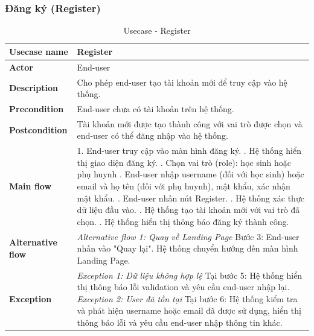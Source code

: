 \newpage
\subsubsection{Đăng ký (Register)}
\begin{table}[H]
  \centering
  \renewcommand{\arraystretch}{1.3}
  \begin{tabular}{|l|p{}|}
    \hline
    \textbf{Usecase name} & Register \\ \hline
    \textbf{Actor} & End-user \\ \hline
    \textbf{Description} & Cho phép end-user tạo tài khoản mới để truy cập vào hệ thống. \\ \hline
    \textbf{Precondition} & End-user chưa có tài khoản trên hệ thống. \\ \hline
    \textbf{Postcondition} & Tài khoản mới được tạo thành công với vai trò được chọn và end-user có thể đăng nhập vào hệ thống. \\ \hline
    \textbf{Main flow} &
    1. End-user truy cập vào màn hình đăng ký. \newline
    2. Hệ thống hiển thị giao diện đăng ký. \newline
    3. Chọn vai trò (role): học sinh hoặc phụ huynh \newline
    4. End-user nhập username (đối với học sinh) hoặc email và họ tên (đối với phụ huynh), mật khẩu, xác nhận mật khẩu. \newline
    5. End-user nhấn nút Register. \newline
    7. Hệ thống xác thực dữ liệu đầu vào. \newline
    8. Hệ thống tạo tài khoản mới với vai trò đã chọn. \newline
    9. Hệ thống hiển thị thông báo đăng ký thành công. \\ \hline
    \textbf{Alternative flow} &
    \textit{Alternative flow 1: Quay về Landing Page} \newline
Bước 3: End-user nhấn vào "Quay lại". \newline
    Hệ thống chuyển hướng đến màn hình Landing Page. \\ \hline
    \textbf{Exception} &
    \textit{Exception 1: Dữ liệu không hợp lệ} \newline
    Tại bước 5: Hệ thống hiển thị thông báo lỗi validation và yêu cầu end-user nhập lại. \newline\newline
    \textit{Exception 2: User đã tồn tại} \newline
    Tại bước 6: Hệ thống kiểm tra và phát hiện username hoặc email đã được sử dụng, hiển thị thông báo lỗi và yêu cầu end-user nhập thông tin khác. \\ \hline
  \end{tabular}
  \caption{Usecase - Register}
  \label{table:uc_signup}
\end{table}
